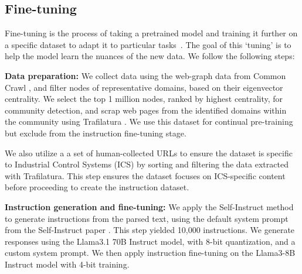 \documentclass[conference]{IEEEtran}
\begin{document}
\subsection{Fine-tuning}

Fine-tuning is the process of taking a pretrained model and training it further on a specific dataset to adapt it to particular tasks~\cite{zhang2024scaling}. The goal of this ‘tuning’ is to help the model learn the nuances of the new data. We follow the following steps:

\textbf{Data preparation:} We collect data using the web-graph data from Common Crawl \cite{commoncrawl}, and filter nodes of representative domains, based on their eigenvector centrality. We select the top 1 million nodes, ranked by highest centrality, for community detection, and scrap web pages from the identified domains within the community using Trafilatura \cite{barbaresi-2021-trafilatura}. We use this dataset for continual pre-training but exclude from the instruction fine-tuning stage.

We also utilize a a set of human-collected URLs to ensure the dataset is specific to Industrial Control Systems (ICS) by sorting and filtering the data extracted with Trafilatura. This step ensures the dataset focuses on ICS-specific content before proceeding to create the instruction dataset.

\textbf{Instruction generation and fine-tuning:} We apply the Self-Instruct method to generate instructions from the parsed text, using the default system prompt from the Self-Instruct paper \cite{wang2022self}. This step yielded 10,000 instructions. We generate responses using the Llama3.1 70B Instruct model, with 8-bit quantization, and a custom system prompt. We then apply instruction fine-tuning on the Llama3-8B Instruct model with 4-bit training.

\begin{table}[]
\centering 
\caption{Benchmark results on customized LLMs}
\label{tab:customizedLLMs}
\end{table}
\end{document}
